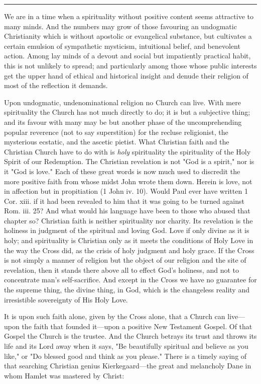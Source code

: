 \documentclass[12pt,letterpaper,oneside]{book}
\begin{document}
\begin{center}
\noindent\rule{4cm}{0.4pt}
\end{center}

We are in a time when a spirituality without 
positive content seems attractive to many minds. 
And the numbers may grow of those favouring 
an undogmatic Christianity which is without 
apostolic or evangelical substance, but cultivates 
a certain emulsion of sympathetic mysticism, 
intuitional belief, and benevolent action. Among 
lay minds of a devout and social but impatiently 
practical habit, this is not unlikely to spread; 
and particularly among those whose public interests 
get the upper hand of ethical and 
historical insight and denude their religion of 
most of the reflection it demands. 

Upon undogmatic, undenominational religion 
no Church can live. With mere spirituality the 
Church has not much directly to do; it is but 
a subjective thing; and its favour with many 
may be but another phase of the uncomprehending 
popular reverence (not to say superstition) 
for the recluse religionist, the mysterious 
ecstatic, and the ascetic pietist. What Christian 
faith and the Christian Church have to do with 
is \textit{holy} spirituality the spirituality of the Holy 
Spirit of our Redemption. The Christian revelation 
is not "God is a spirit," nor is it "God 
is love." Each of these great words is now 
much used to discredit the more positive faith 
from whose midst John wrote them down. 
Herein is love, not in affection but in propitiation 
(1 John iv. 10). Would Paul ever 
have written 1 Cor. xiii. if it had been revealed 
to him that it was going to be turned against 
Rom. iii. 25? And what would his language 
have been to those who abused that chapter 
so? Christian faith is neither spirituality nor 
charity. Its revelation is the holiness in judgment 
of the spiritual and loving God. Love 
if only divine as it is holy; and spirituality is 
Christian only as it meets the conditions of 
Holy Love in the way the Cross did, as the 
crisis of holy judgment and holy grace. If 
the Cross is not simply a manner of religion 
but the object of our religion and the site 
of revelation, then it stands there above all 
to effect God's holiness, and not to concentrate 
man's self-sacrifice. And except in the 
Cross we have no guarantee for the supreme 
thing, the divine thing, in God, which is the 
changeless reality and irresistible sovereignty 
of His Holy Love. 

It is upon such faith alone, given by the Cross 
alone, that a Church can live---upon the faith 
that founded it---upon a positive New Testament 
Gospel. Of that Gospel the Church is 
the trustee. And the Church betrays its trust 
and throws its life and its Lord away when it 
says, "Be beautifully spiritual and believe as 
you like," or "Do blessed good and think as you 
please." 
There is a timely saying of that searching 
Christian genius Kierkegaard---the great and 
melancholy Dane in whom Hamlet was mastered 
by Christ: 
\end{document}
